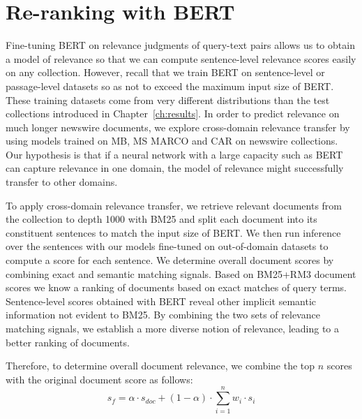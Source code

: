 \section{Re-ranking with BERT}


Fine-tuning BERT on relevance judgments of query-text pairs allows us to obtain a model of relevance so that we can compute sentence-level relevance scores easily on any collection.
However, recall that we train BERT on sentence-level or passage-level datasets so as not to exceed the maximum input size of BERT.
These training datasets come from very different distributions than the test collections introduced in Chapter~\ref{ch:results}.
In order to predict relevance on much longer newswire documents, we explore cross-domain relevance transfer by using models trained on MB, MS MARCO and CAR on newswire collections.
Our hypothesis is that if a neural network with a large capacity such as BERT can capture relevance in one domain, the model of relevance might successfully transfer to other domains.

To apply cross-domain relevance transfer, we retrieve relevant documents from the collection to depth 1000 with BM25 and split each document into its constituent sentences to match the input size of BERT.
We then run inference over the sentences with our models fine-tuned on out-of-domain datasets to compute a score for each sentence.
We determine overall document scores by combining exact and semantic matching signals.
Based on BM25+RM3 document scores we know a ranking of documents based on exact matches of query terms.
Sentence-level scores obtained with BERT reveal other implicit semantic information not evident to BM25.
By combining the two sets of relevance matching signals, we establish a more diverse notion of relevance, leading to a better ranking of documents.

Therefore, to determine overall document relevance, we combine the top $ n $ scores with the original document score as follows:
\begin{equation} \label{eq:1}
s_f = \alpha \cdot s_{doc}  + (1 - \alpha) \cdot \sum_{i = 1}^n w_i \cdot s_i
\end{equation}

